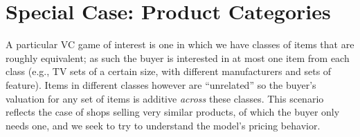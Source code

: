 \section{Special Case: Product Categories}
\label{semi-equivalent}

A particular VC game of interest is one in which we have classes of items that are
roughly equivalent; as such the buyer is interested
in at most one item from each class (e.g., TV sets of a
certain size, with different manufacturers and sets of feature). 
Items in different classes however are ``unrelated'' so
the buyer's valuation for any set of items is additive \emph{across} 
these classes.
This scenario reflects the case of shops selling very similar products, of
which the buyer only needs one, and we seek to try to understand the model's pricing behavior.

